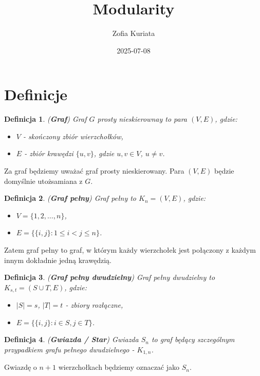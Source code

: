 \documentclass[letterpaper,12pt]{article}
\title{Modularity}
\author{Zofia Kuriata}
\date{2025-07-08}
\newtheorem{definition}{Definicja}
\begin{document}
\maketitle
\tableofcontents


\section{Definicje}
  \begin{definition}
    (\textbf{Graf}) Graf \(G\) prosty nieskierownay to para \((V, E)\), gdzie:
    \begin{itemize}
      \item \(V\) - skończony zbiór wierzchołków,
      \item \(E\) - zbiór krawędzi \(\{u, v\}\), gdzie \(u, v \in V\), \(u \neq v\).
    \end{itemize}
  \end{definition}
  Za graf będziemy uważać graf prosty nieskierowany. Para \((V, E)\) będzie domyślnie utożsamiana z \(G\).\\

  \begin{definition}
    (\textbf{Graf pełny}) Graf pełny to \(K_n = (V,E)\), gdzie:
    \begin{itemize}
      \item \(V = \{1, 2, \ldots, n\}\),
      \item \(E = \{\{i, j\} : 1 \leq i < j \leq n\}\).
    \end{itemize}
  \end{definition}
  Zatem graf pełny to graf, w którym każdy wierzchołek jest połączony z każdym innym dokładnie jedną krawędzią.\\

  \begin{definition}
    (\textbf{Graf pełny dwudzielny}) Graf pełny dwudzielny to \(K_{s,t} = (S \cup T,E)\), gdzie:
    \begin{itemize}
      \item \(|S|=s\), \(|T|=t\) - zbiory rozłączne,
      \item \(E = \{\{i, j\} : i \in S, j \in T\}\).
    \end{itemize}
  \end{definition}

  \begin{definition}
    (\textbf{Gwiazda / Star}) Gwiazda \(S_n\) to graf będący szczególnym przypadkiem grafu pełnego dwudzielnego - \(K_{1,n}\).
  \end{definition}
  Gwiazdę o \(n+1\) wierzchołkach będziemy oznaczać jako \(S_n\).\\
\end{document}
